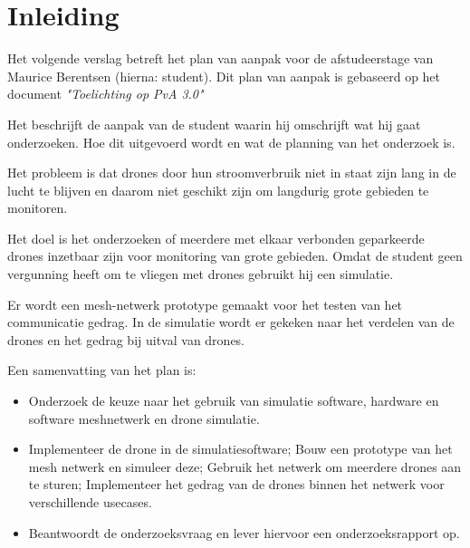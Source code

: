 \documentclass[a4paper, 11pt, oneside]{report}
\begin{document}




\chapter{Inleiding}
\label{chapter:inleiding}
Het volgende verslag betreft het plan van aanpak voor de afstudeerstage van Maurice Berentsen (hierna: student).
Dit plan van aanpak is gebaseerd op het document \textit{"Toelichting op PvA 3.0"} \cite{HoePVA}

Het beschrijft de aanpak van de student waarin hij omschrijft wat hij gaat onderzoeken. 
Hoe dit uitgevoerd wordt en wat de planning van het onderzoek is.

Het probleem is dat drones door hun stroomverbruik niet in staat zijn lang in de lucht te blijven en daarom niet geschikt zijn om langdurig grote gebieden te monitoren.

Het doel is het onderzoeken of meerdere met elkaar verbonden geparkeerde drones inzetbaar zijn voor monitoring van grote gebieden. Omdat de student geen vergunning heeft om te vliegen met drones gebruikt hij een simulatie.

Er wordt een mesh-netwerk prototype gemaakt voor het testen van het communicatie gedrag.
In de simulatie wordt er gekeken naar het verdelen van de drones en het gedrag bij uitval van drones.

Een samenvatting van het plan is:

\begin{itemize}
	\item Onderzoek de keuze naar het gebruik van simulatie software, hardware en software meshnetwerk en drone simulatie.
	\item Implementeer de drone in de simulatiesoftware; Bouw een prototype van het mesh netwerk en simuleer deze; Gebruik het netwerk om meerdere drones aan te sturen; Implementeer het gedrag van de drones binnen het netwerk voor verschillende usecases. %
	\item Beantwoordt de onderzoeksvraag en lever hiervoor een onderzoeksrapport op.
\end{itemize}
\end{document}
